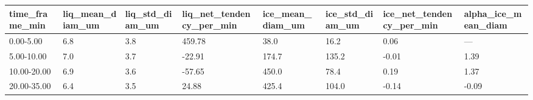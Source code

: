 \begin{tabular}{llllllll}
\toprule
time_frame_min & liq_mean_diam_um & liq_std_diam_um & liq_net_tendency_per_min & ice_mean_diam_um & ice_std_diam_um & ice_net_tendency_per_min & alpha_ice_mean_diam \\
\midrule
0.00-5.00 & 6.8 & 3.8 & 459.78 & 38.0 & 16.2 & 0.06 & — \\
5.00-10.00 & 7.0 & 3.7 & -22.91 & 174.7 & 135.2 & -0.01 & 1.39 \\
10.00-20.00 & 6.9 & 3.6 & -57.65 & 450.0 & 78.4 & 0.19 & 1.37 \\
20.00-35.00 & 6.4 & 3.5 & 24.88 & 425.4 & 104.0 & -0.14 & -0.09 \\
\bottomrule
\end{tabular}
